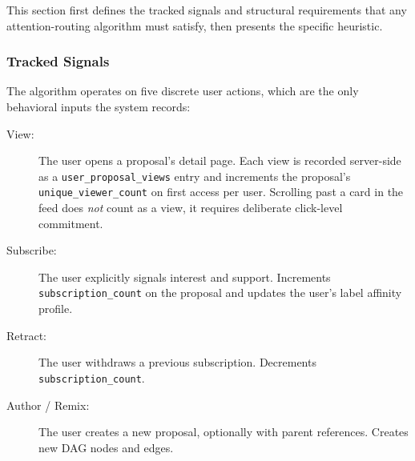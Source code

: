 \documentclass[a4paper, 12pt, twoside]{iviathesis}
\begin{document}
This section first defines the tracked signals and structural requirements that any attention-routing algorithm must satisfy, then presents the specific heuristic.

\subsubsection{Tracked Signals}
The algorithm operates on five discrete user actions, which are the only behavioral inputs the system records:
\begin{description}
    \item[View:] The user opens a proposal's detail page. Each view is recorded server-side as a \texttt{user\_proposal\_views} entry and increments the proposal's \texttt{unique\_viewer\_count} on first access per user. Scrolling past a card in the feed does \textit{not} count as a view, it requires deliberate click-level commitment.
    \item[Subscribe:] The user explicitly signals interest and support. Increments \texttt{subscription\_count} on the proposal and updates the user's label affinity profile.
    \item[Retract:] The user withdraws a previous subscription. Decrements \texttt{subscription\_count}.
    \item[Author / Remix:] The user creates a new proposal, optionally with parent references. Creates new DAG nodes and edges.
\end{description}
\end{document}

